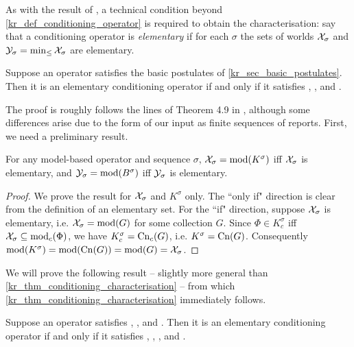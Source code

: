 As with the result of \citeauthor{delgrande2018general}, a technical condition beyond
\cref{kr_def_conditioning_operator} is required to obtain the characterisation:
say that a conditioning operator is \emph{elementary} if for each $\sigma$ the
sets of worlds $\mathcal{X}_\sigma$ and $\mathcal{Y}_\sigma = \min_{\le}\mathcal{X}_\sigma$ are
elementary.\footnotemark{}
%

\begin{theorem}
    \label{kr_thm_conditioning_characterisation}
    Suppose an operator satisfies the basic postulates of
    \cref{kr_sec_basic_postulates}.\footnotemark{} Then it is an elementary
    conditioning operator if and only if it satisfies \duprem{},
    \condcons{}, \incvac{} and \acyc{}.

\end{theorem}

The proof is roughly follows the lines of Theorem 4.9 in
\cite{delgrande2018general}, although some
differences arise due to the form of our input as finite sequences of reports.
First, we need a preliminary result.

\begin{lemma}
\label{kr_lemma_model_based_elementary}
    For any model-based operator and sequence $\sigma$, $\mathcal{X}_\sigma =
    \operatorname{mod}(K^\sigma)$ iff $\mathcal{X}_\sigma$ is elementary, and $\mathcal{Y}_\sigma =
    \operatorname{mod}(B^\sigma)$ iff $\mathcal{Y}_\sigma$ is elementary.
\end{lemma}

\begin{proof}
We prove the result for $\mathcal{X}_\sigma$ and $K^\sigma$ only. The ``only if"
direction is clear from the definition of an elementary set. For the ``if"
direction, suppose $\mathcal{X}_\sigma$ is elementary, i.e. $\mathcal{X}_\sigma = \operatorname{mod}(G)$ for
some collection $G$. Since $\Phi \in K^\sigma_c$ iff $\mathcal{X}_\sigma \subseteq
\operatorname{mod}_c(\Phi)$, we have $K^\sigma_c = \operatorname{Cn}_c(G)$, i.e. $K^\sigma = \operatorname{Cn}(G)$.
Consequently $\operatorname{mod}(K^\sigma) = \operatorname{mod}(\operatorname{Cn}(G)) = \operatorname{mod}(G) = \mathcal{X}_\sigma$.
\end{proof}

We will prove the following result -- slightly more general than
\cref{kr_thm_conditioning_characterisation} -- from which
\cref{kr_thm_conditioning_characterisation} immediately follows.

\begin{proposition}
    \label{kr_prop_conditioning_pre_characterisation}
    Suppose an operator satisfies \closure{}, \containment{},
    \kconj{} and \equivpost{}. Then it is an elementary
    conditioning operator if and only if it satisfies \rearr{},
    \duprem{}, \condcons{},
    \incvac{} and \acyc{}.
\end{proposition}

